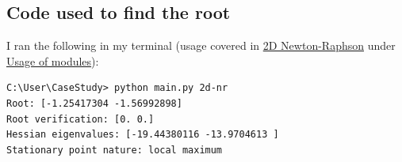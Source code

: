 \documentclass[../main.tex]{subfiles}
\begin{document}
    \subsection*{Code used to find the root}\label{subsec:2d-nr-code}
    I ran the following in my terminal (usage covered in
    \hyperref[subsubsec:2d-nr-appendix]{2D Newton-Raphson} under
    \hyperref[subsec:usage-of-modules]{Usage of modules}):
    \begin{lstlisting}[style=console,label={lst:2d-nr}]
C:\User\CaseStudy> python main.py 2d-nr
Root: [-1.25417304 -1.56992898]
Root verification: [0. 0.]
Hessian eigenvalues: [-19.44380116 -13.9704613 ]
Stationary point nature: local maximum
    \end{lstlisting}
\end{document}
